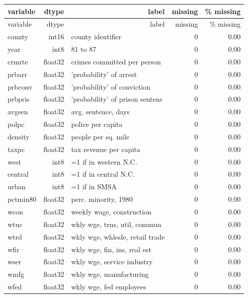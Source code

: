 \documentclass{article}
\begin{document}
\footnotesize
\setlength{\tabcolsep}{4pt}
\renewcommand{\arraystretch}{0.9}
\begin{longtable}{p{} r p{} r r}
\toprule
\multicolumn{1}{l}{variable} & \multicolumn{1}{r}{dtype} & \multicolumn{1}{r}{label} & \multicolumn{1}{r}{missing} & \multicolumn{1}{r}{\% missing} \\
\midrule
\endfirsthead
\toprule
\multicolumn{1}{l}{variable} & \multicolumn{1}{r}{dtype} & \multicolumn{1}{r}{label} & \multicolumn{1}{r}{missing} & \multicolumn{1}{r}{\% missing} \\
\midrule
\endhead
county & int16 & county identifier & 0 & 0.00 \\
year & int8 & 81 to 87 & 0 & 0.00 \\
crmrte & float32 & crimes committed per person & 0 & 0.00 \\
prbarr & float32 & 'probability' of arrest & 0 & 0.00 \\
prbconv & float32 & 'probability' of conviction & 0 & 0.00 \\
prbpris & float32 & 'probability' of prison sentenc & 0 & 0.00 \\
avgsen & float32 & avg. sentence, days & 0 & 0.00 \\
polpc & float32 & police per capita & 0 & 0.00 \\
density & float32 & people per sq. mile & 0 & 0.00 \\
taxpc & float32 & tax revenue per capita & 0 & 0.00 \\
west & int8 & =1 if in western N.C. & 0 & 0.00 \\
central & int8 & =1 if in central N.C. & 0 & 0.00 \\
urban & int8 & =1 if in SMSA & 0 & 0.00 \\
pctmin80 & float32 & perc. minority, 1980 & 0 & 0.00 \\
wcon & float32 & weekly wage, construction & 0 & 0.00 \\
wtuc & float32 & wkly wge, trns, util, commun & 0 & 0.00 \\
wtrd & float32 & wkly wge, whlesle, retail trade & 0 & 0.00 \\
wfir & float32 & wkly wge, fin, ins, real est & 0 & 0.00 \\
wser & float32 & wkly wge, service industry & 0 & 0.00 \\
wmfg & float32 & wkly wge, manufacturing & 0 & 0.00 \\
wfed & float32 & wkly wge, fed employees & 0 & 0.00 \\

\end{longtable}
\end{document}
